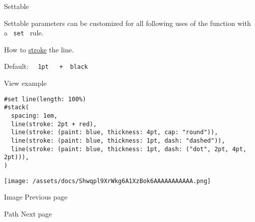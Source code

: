 {{ Settable }}

\label{parameters-stroke-settable-tooltip}
Settable parameters can be customized for all following uses of the
function with a \texttt{\ set\ } rule.

How to \href{/docs/reference/visualize/stroke/}{stroke} the line.

Default:
\texttt{\ }{\texttt{\ 1pt\ }}\texttt{\ }{\texttt{\ +\ }}\texttt{\ black\ }


View example

\begin{verbatim}
#set line(length: 100%)
#stack(
  spacing: 1em,
  line(stroke: 2pt + red),
  line(stroke: (paint: blue, thickness: 4pt, cap: "round")),
  line(stroke: (paint: blue, thickness: 1pt, dash: "dashed")),
  line(stroke: (paint: blue, thickness: 1pt, dash: ("dot", 2pt, 4pt, 2pt))),
)
\end{verbatim}

\texttt{[image: /assets/docs/Shwqpl9XrWkg6A1XzBok6AAAAAAAAAAA.png]}

\href{/docs/reference/visualize/image/}{\pandocbounded{}}

{ Image } { Previous page }

\href{/docs/reference/visualize/path/}{\pandocbounded{}}

{ Path } { Next page }

